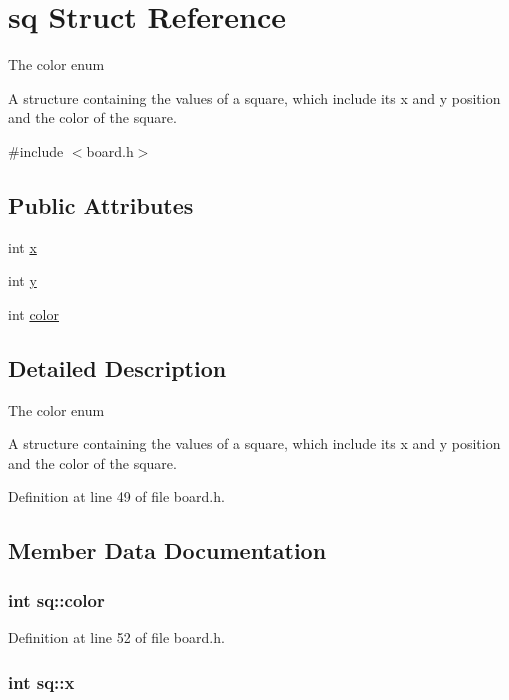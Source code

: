 \hypertarget{structsq}{\section{sq Struct Reference}
\label{structsq}
}


The color enum

A structure containing the values of a square, which include its x and y position and the color of the square.  




{\ttfamily \#include $<$board.\-h$>$}

\subsection*{Public Attributes}
\begin{DoxyCompactItemize}
\item 
int \hyperlink{structsq_aed5c1efc6e43c1bf7a230b8b8a373368}{x}
\item 
int \hyperlink{structsq_a1b0e5a26db37d818cb634406f2314293}{y}
\item 
int \hyperlink{structsq_a9456cfcbc3cb1beec5d3254091afa355}{color}
\end{DoxyCompactItemize}


\subsection{Detailed Description}
The color enum

A structure containing the values of a square, which include its x and y position and the color of the square. 

Definition at line 49 of file board.\-h.



\subsection{Member Data Documentation}
\hypertarget{structsq_a9456cfcbc3cb1beec5d3254091afa355}{
\subsubsection[{color}]{\setlength{\rightskip}{0pt plus 5cm}int sq\-::color}}\label{structsq_a9456cfcbc3cb1beec5d3254091afa355}


Definition at line 52 of file board.\-h.

\hypertarget{structsq_aed5c1efc6e43c1bf7a230b8b8a373368}{
\subsubsection[{x}]{\setlength{\rightskip}{0pt plus 5cm}int sq\-::x}}\label{structsq_aed5c1efc6e43c1bf7a230b8b8a373368}


